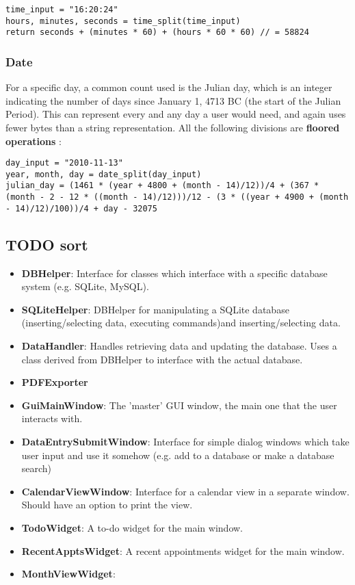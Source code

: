 \begin{verbatim}
time_input = "16:20:24"
hours, minutes, seconds = time_split(time_input)
return seconds + (minutes * 60) + (hours * 60 * 60) // = 58824
\end{verbatim}


\subsubsection{Date}

For a specific day, a common count used is the Julian day, which is an integer
indicating the number of days since January 1, 4713 BC (the start of the Julian
Period). This can represent every and any day a user would need, and again uses
fewer bytes than a string representation. All the following divisions are
\textbf{floored operations} \cite{wiki-julian}:

\begin{verbatim}
day_input = "2010-11-13"
year, month, day = date_split(day_input)
julian_day = (1461 * (year + 4800 + (month - 14)/12))/4 + (367 * (month - 2 - 12 * ((month - 14)/12)))/12 - (3 * ((year + 4900 + (month - 14)/12)/100))/4 + day - 32075
\end{verbatim}


\subsection{TODO sort}

\newcommand{\classitem}[1]{\item \textbf{#1}}

\begin{itemize}
    \classitem{DBHelper}: Interface for classes which interface with a specific
    database system (e.g. SQLite, MySQL).
    \classitem{SQLiteHelper}: DBHelper for manipulating a SQLite database
    (inserting/selecting data, executing commands)and inserting/selecting data.
    \classitem{DataHandler}: Handles retrieving data and updating the database.
    Uses a class derived from DBHelper to interface with the actual database.
    \classitem{PDFExporter}
\end{itemize}

\begin{itemize}
    \classitem{GuiMainWindow}: The 'master' GUI window, the main one that the
        user interacts with.
    \classitem{DataEntrySubmitWindow}: Interface for simple dialog windows
        which take user input and use it somehow (e.g. add to a database or make
        a database search)
    \classitem{CalendarViewWindow}: Interface for a calendar view in a separate
        window. Should have an option to print the view.
    \classitem{TodoWidget}: A to-do widget for the main window.
    \classitem{RecentApptsWidget}: A recent appointments widget for the main
    window.
    \classitem{MonthViewWidget}:
\end{itemize}


